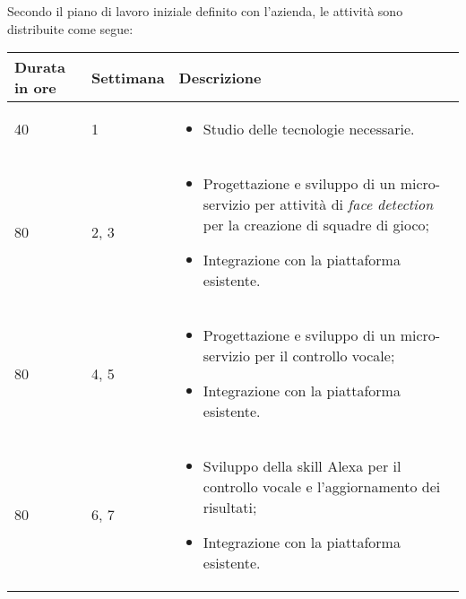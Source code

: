 \noindent Secondo il piano di lavoro iniziale definito con l'azienda, le attività sono distribuite come segue:

\begin{center}
	
	\renewcommand{\arraystretch}{1.5}
	
		\centering
		\begin{longtable}{| C{2.5cm} | C{2cm} | L{7.2cm} |}
			
			\hline
			
			\textbf{Durata in ore} & \textbf{Settimana} & \textbf{Descrizione} \\
			
			\hline
			
			40 & 1 &
			\begin{itemize}[leftmargin=*]
				\item Studio delle tecnologie necessarie.
			\end{itemize} \\
			
			\hline
			
			80 & 2, 3 &
			\begin{itemize}[leftmargin=*]
				\item Progettazione e sviluppo di un micro-servizio per attività di \emph{face detection} per 
				la creazione di squadre di gioco;
				\item Integrazione con la piattaforma esistente. 
			\end{itemize}  \\
			
			\hline
		
			
			80 & 4, 5 &
			\begin{itemize}[leftmargin=*]
				\item Progettazione e sviluppo di un micro-servizio per il controllo vocale;
				\item Integrazione con la piattaforma esistente. 
			\end{itemize}  \\
			 
			\hline
			
			80 & 6, 7 &
			\begin{itemize}[leftmargin=*]
				\item Sviluppo della skill Alexa per il controllo vocale e l'aggiornamento dei risultati;
				\item Integrazione con la piattaforma esistente. 
			\end{itemize}  \\
			

\end{longtable}
\end{center}
